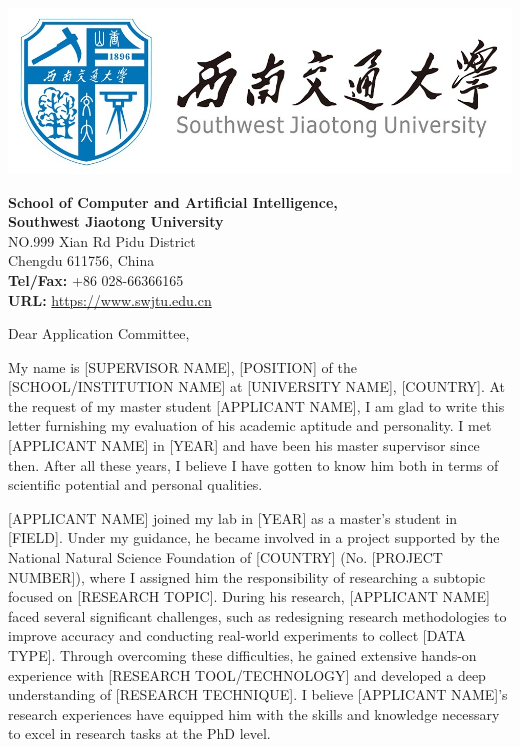 \documentclass[11pt]{article}
\begin{document}
\begin{minipage}{0.5\textwidth}
    \includegraphics[width=\linewidth]{swjtu.jpeg}
\end{minipage}
\hfill
\begin{minipage}{0.5\textwidth}
    \raggedleft
    \textbf{School of Computer and Artificial Intelligence,} \\
    \textbf{Southwest Jiaotong University} \\
    NO.999 Xian Rd Pidu District \\
    Chengdu 611756, China \\
    \textbf{Tel/Fax:} +86 028-66366165 \\
    \textbf{URL:} \href{https://www.swjtu.edu.cn}{https://www.swjtu.edu.cn}
\end{minipage}

\vspace{1em}

Dear Application Committee,

\bigskip

My name is [SUPERVISOR NAME], [POSITION] of the [SCHOOL/INSTITUTION NAME] at [UNIVERSITY NAME], [COUNTRY]. At the request of my master student [APPLICANT NAME], I am glad to write this letter furnishing my evaluation of his academic aptitude and personality. I met [APPLICANT NAME] in [YEAR] and have been his master supervisor since then. After all these years, I believe I have gotten to know him both in terms of scientific potential and personal qualities.

\bigskip

[APPLICANT NAME] joined my lab in [YEAR] as a master's student in [FIELD]. Under my guidance, he became involved in a project supported by the National Natural Science Foundation of [COUNTRY] (No. [PROJECT NUMBER]), where I assigned him the responsibility of researching a subtopic focused on [RESEARCH TOPIC]. During his research, [APPLICANT NAME] faced several significant challenges, such as redesigning research methodologies to improve accuracy and conducting real-world experiments to collect [DATA TYPE]. Through overcoming these difficulties, he gained extensive hands-on experience with [RESEARCH TOOL/TECHNOLOGY] and developed a deep understanding of [RESEARCH TECHNIQUE]. I believe [APPLICANT NAME]’s research experiences have equipped him with the skills and knowledge necessary to excel in research tasks at the PhD level.
\end{document}

